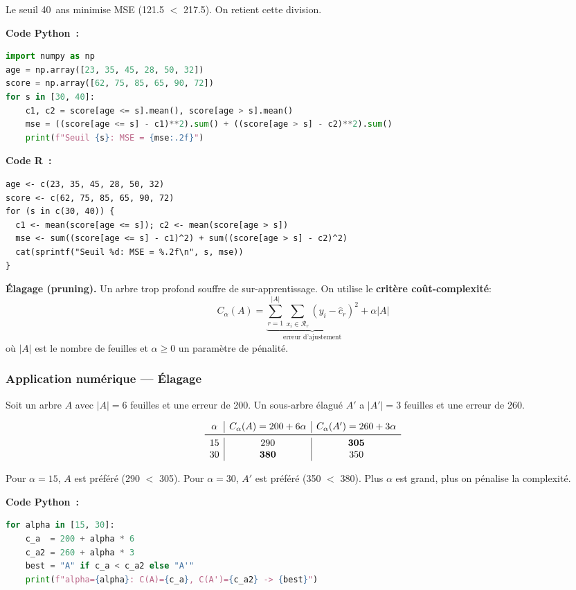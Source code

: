 \documentclass[a4paper,12pt]{article}
\begin{document}
Le seuil 40~ans minimise MSE (121.5 $<$ 217.5). On retient cette division.

\newpage


\noindent\textbf{Code Python~:}
\begin{lstlisting}[language=Python]
import numpy as np
age = np.array([23, 35, 45, 28, 50, 32])
score = np.array([62, 75, 85, 65, 90, 72])
for s in [30, 40]:
    c1, c2 = score[age <= s].mean(), score[age > s].mean()
    mse = ((score[age <= s] - c1)**2).sum() + ((score[age > s] - c2)**2).sum()
    print(f"Seuil {s}: MSE = {mse:.2f}")
\end{lstlisting}

\noindent\textbf{Code R~:}
\begin{lstlisting}[]
age <- c(23, 35, 45, 28, 50, 32)
score <- c(62, 75, 85, 65, 90, 72)
for (s in c(30, 40)) {
  c1 <- mean(score[age <= s]); c2 <- mean(score[age > s])
  mse <- sum((score[age <= s] - c1)^2) + sum((score[age > s] - c2)^2)
  cat(sprintf("Seuil %d: MSE = %.2f\n", s, mse))
}
\end{lstlisting}
\newpage

\textbf{Élagage (pruning).} Un arbre trop profond souffre de sur-apprentissage. On utilise le \textbf{critère coût-complexité}:
\[
C_\alpha(A) = \underbrace{\sum_{r=1}^{|A|} \sum_{x_i \in \mathcal{R}_r} (y_i - \hat{c}_r)^2}_{\text{erreur d'ajustement}} + \alpha |A|
\]
où $|A|$ est le nombre de feuilles et $\alpha \geq 0$ un paramètre de pénalité.

\subsubsection*{Application numérique — Élagage}
Soit un arbre $A$ avec $|A|=6$ feuilles et une erreur de 200.
Un sous-arbre élagué $A'$ a $|A'|=3$ feuilles et une erreur de 260.

\[
\begin{array}{c|c|c}
\alpha & C_\alpha(A)=200+6\alpha & C_\alpha(A')=260+3\alpha \\ \midrule
15 & 290 & \textbf{305} \\
30 & \textbf{380} & 350 \\
\end{array}
\]

Pour $\alpha=15$, $A$ est préféré (290 $<$ 305).
Pour $\alpha=30$, $A'$ est préféré (350 $<$ 380).
Plus $\alpha$ est grand, plus on pénalise la complexité.

\newpage
\noindent\textbf{Code Python~:}
\begin{lstlisting}[language=Python]
for alpha in [15, 30]:
    c_a  = 200 + alpha * 6
    c_a2 = 260 + alpha * 3
    best = "A" if c_a < c_a2 else "A'"
    print(f"alpha={alpha}: C(A)={c_a}, C(A')={c_a2} -> {best}")
\end{lstlisting}
\end{document}
